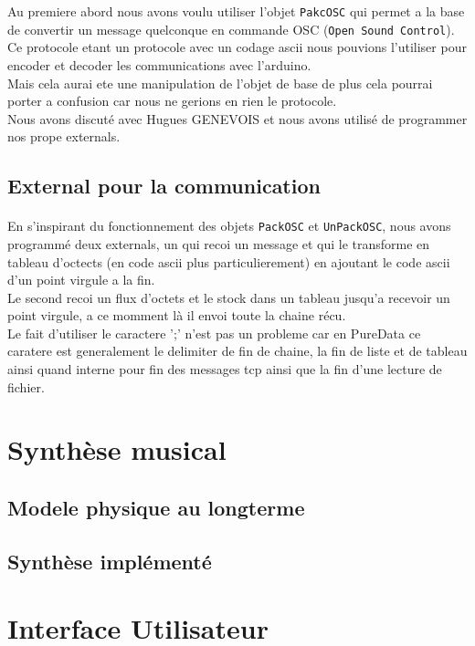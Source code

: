 \documentclass[a4paper, titlepage, oneside, 12pt]{article}%
\begin{document}
Au premiere abord nous avons voulu utiliser l'objet \texttt{PakcOSC} qui permet a la base de convertir un message quelconque en commande OSC (\texttt{Open Sound Control}). Ce protocole etant un protocole avec un codage ascii nous pouvions l'utiliser pour encoder et decoder les communications avec l'arduino. \\
Mais cela aurai ete une manipulation de l'objet de base de plus cela pourrai porter a confusion car nous ne gerions en rien le protocole.\\
Nous avons discuté avec Hugues GENEVOIS et nous avons utilisé de programmer nos prope externals.

\subsection{External pour la communication}
\paragraph{}
En s'inspirant du fonctionnement des objets \texttt{PackOSC} et \texttt{UnPackOSC}, nous avons programmé deux externals, un qui recoi un message et qui le transforme en tableau d'octects (en code ascii plus particulierement) en ajoutant le code ascii d'un point virgule a la fin.\\
Le second recoi un flux d'octets et le stock dans un tableau jusqu'a recevoir un point virgule, a ce momment là il envoi toute la chaine récu.\\
Le fait d'utiliser le caractere ';' n'est pas un probleme car en PureData ce caratere est generalement le delimiter de fin de chaine, la fin de liste et de tableau ainsi quand interne pour fin des messages tcp ainsi que la fin d'une lecture de fichier.

\newpage
\section{Synthèse musical}
\subsection{Modele physique au longterme}

\subsection{Synthèse implémenté}

\newpage
\section{Interface Utilisateur}
\end{document}

